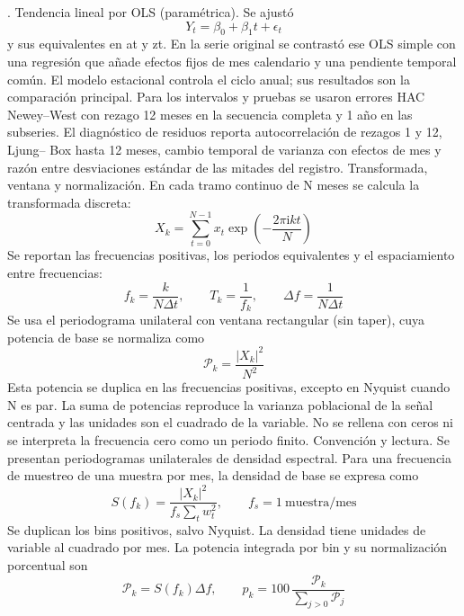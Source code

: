 \documentclass[10pt]{article}
\begin{document}
. Tendencia lineal por OLS (paramétrica). Se ajustó 
\begin{equation}
Y_t=\beta_0+\beta_1t+\epsilon_t\tag{3.6}
\end{equation}
 y sus equivalentes en at y zt. En la serie original se contrastó ese OLS simple con una regresión que añade efectos fijos de mes calendario y una pendiente temporal común. El modelo estacional controla el ciclo anual; sus resultados son la comparación principal. Para los intervalos y pruebas se usaron errores HAC Newey--West con rezago 12 meses en la secuencia completa y 1 año en las subseries. El diagnóstico de residuos reporta autocorrelación de rezagos 1 y 12, Ljung-- Box hasta 12 meses, cambio temporal de varianza con efectos de mes y razón entre desviaciones estándar de las mitades del registro.
\newpage
Transformada, ventana y normalización. En cada tramo continuo de N meses se calcula la transformada discreta:
\begin{equation}
X_k=\sum_{t=0}^{N-1}x_t\exp\!\left(-\frac{2\pi\mathrm{i}kt}{N}\right)\tag{4.1}
\end{equation}
Se reportan las frecuencias positivas, los periodos equivalentes y el espaciamiento entre frecuencias:
\begin{equation}
f_k=\frac{k}{N\Delta t},\qquad T_k=\frac{1}{f_k},\qquad\Delta f=\frac{1}{N\Delta t}\tag{4.2}
\end{equation}
Se usa el periodograma unilateral con ventana rectangular (sin taper), cuya potencia de base se normaliza como
\begin{equation}
\mathcal{P}_k=\frac{|X_k|^2}{N^2}\tag{4.3}
\end{equation}
Esta potencia se duplica en las frecuencias positivas, excepto en Nyquist cuando N es par. La suma de potencias reproduce la varianza poblacional de la señal centrada y las unidades son el cuadrado de la variable. No se rellena con ceros ni se interpreta la frecuencia cero como un periodo finito.
\newpage
Convención y lectura. Se presentan periodogramas unilaterales de densidad espectral. Para una frecuencia de muestreo de una muestra por mes, la densidad de base se expresa como
\begin{equation}
S(f_k)=\frac{|X_k|^2}{f_s\sum_t w_t^2},\qquad f_s=1\ \mathrm{muestra/mes}\tag{4.4}
\end{equation}
Se duplican los bins positivos, salvo Nyquist. La densidad tiene unidades de variable al cuadrado por mes. La potencia integrada por bin y su normalización porcentual son
\begin{equation}
\mathcal{P}_k=S(f_k)\Delta f,\qquad p_k=100\,\frac{\mathcal{P}_k}{\sum_{j>0}\mathcal{P}_j}\tag{4.5}
\end{equation}
\end{document}
